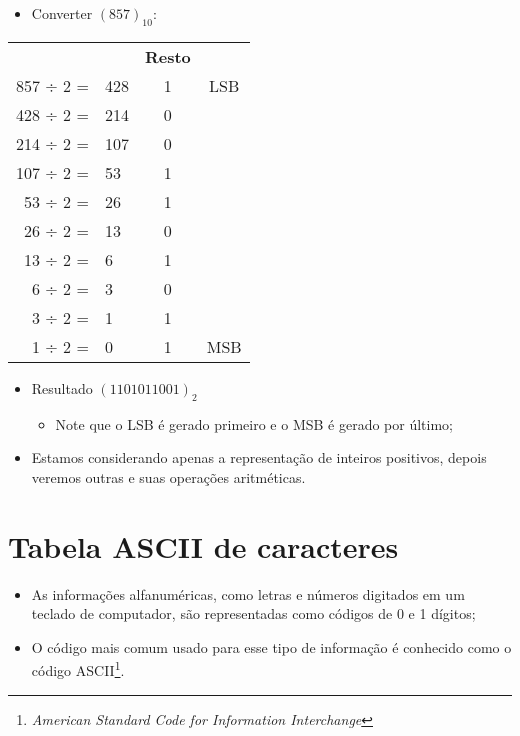 \begin{frame}{\insertsection}
	\begin{itemize}
        \item Converter $(857)_{10}$: 
    \end{itemize}
    \vspace{-0.5cm}
    \begin{table}[]
        \centering \scriptsize 
        \begin{tabular}{rlcc}
              &  & \textbf{Resto}\\
            857 ÷ 2 = & 428 & 1 & LSB\\
            428 ÷ 2 = & 214 & 0 & \\
            214 ÷ 2 = & 107 & 0 & \\
            107 ÷ 2 = & 53  & 1 & \\
             53 ÷ 2 = & 26  & 1 & \\
             26 ÷ 2 = & 13  & 0 & \\
             13 ÷ 2 = & 6   & 1 & \\
              6 ÷ 2 = & 3   & 0 & \\
              3 ÷ 2 = & 1   & 1 & \\
              1 ÷ 2 = & 0   & 1 & MSB\\
        \end{tabular}
    \end{table}
    \begin{itemize}
        \item Resultado  $(1101011001)_2$
        \begin{itemize}
            \item Note que o LSB é gerado primeiro e o MSB é gerado por último;
        \end{itemize}
        \item Estamos considerando apenas a representação de inteiros positivos, depois veremos outras e suas operações aritméticas. 
    \end{itemize}
\end{frame}

\section{Tabela ASCII de caracteres}

\begin{frame}{\insertsection}
    \begin{itemize}
        \item As informações alfanuméricas, como letras e números digitados em um teclado de computador, são representadas como códigos de 0 e 1 dígitos;
        \item O código mais comum usado para esse tipo de informação é conhecido como o código ASCII\footnote{\textit{American Standard Code for Information Interchange}}.
    \end{itemize}
\end{frame}

